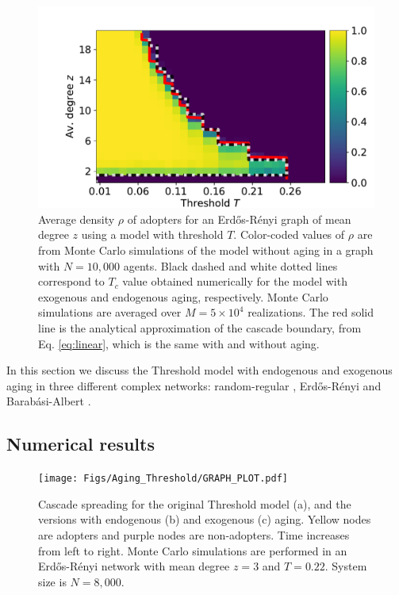\begin{figure}[]
\includegraphics[width=1\columnwidth]{Figs/Aging_Threshold/cascade.pdf}
\caption[Average density $\rho$ of adopters for an Erd\H{o}s-R\'enyi graph]{\label{fig:umbral} Average density $\rho$ of adopters for an Erd\H{o}s-R\'enyi graph of mean degree $z$ using a model with threshold $T$. Color-coded values of $\rho$ are from Monte Carlo simulations of the model without aging in a graph with $N = 10,000$ agents.  Black dashed and white dotted lines correspond to $T_c$ value obtained numerically for the model with exogenous and endogenous aging, respectively.  Monte Carlo simulations are averaged over $M = 5 \times 10^4$ realizations. The red solid line is the analytical approximation of the cascade boundary, from Eq. \eqref{eq:linear}, which is the same with and without aging.}
\end{figure}

In this section we discuss the Threshold model with endogenous and exogenous aging in three different complex networks: random-regular \cite{wormald1999models}, Erd\H{o}s-R\'enyi \cite{erdos1960evolution} and Barab\'asi-Albert \cite{barabasi2009scale}.

\subsection{\label{subsec:Numerical results} Numerical results}

\begin{figure}
\texttt{[image: Figs/Aging\_Threshold/GRAPH\_PLOT.pdf]}
\caption[Cascade spreading for the Threshold model]{\label{fig:graph_plot} Cascade spreading for the original Threshold model (a), and the versions with endogenous (b) and exogenous (c) aging. Yellow nodes are adopters and purple nodes are non-adopters. Time increases from left to right. Monte Carlo simulations are performed in an Erd\H{o}s-R\'enyi network with mean degree $z = 3$ and $T = 0.22$. System size is $N = 8,000$.}
\end{figure}

